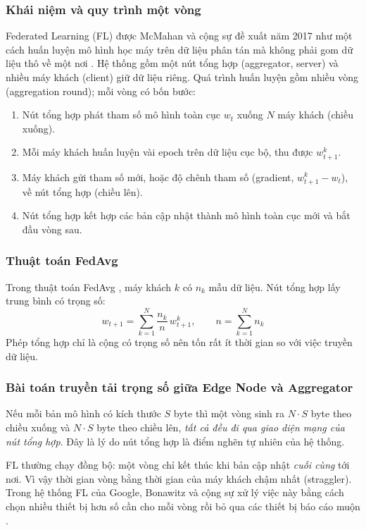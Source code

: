 \subsubsection{Khái niệm và quy trình một vòng}
Federated Learning (FL) được McMahan và cộng sự đề xuất năm 2017 như một cách huấn luyện mô hình học máy trên dữ liệu phân tán mà không phải gom dữ liệu thô về một nơi \cite{mcmahan2017fedavg}. Hệ thống gồm một nút tổng hợp (aggregator, server) và nhiều máy khách (client) giữ dữ liệu riêng. Quá trình huấn luyện gồm nhiều vòng (aggregation round); mỗi vòng có bốn bước:
\begin{enumerate}
    \item Nút tổng hợp phát tham số mô hình toàn cục $w_t$ xuống $N$ máy khách (chiều xuống).
    \item Mỗi máy khách huấn luyện vài epoch trên dữ liệu cục bộ, thu được $w_{t+1}^{k}$.
    \item Máy khách gửi tham số mới, hoặc độ chênh tham số (gradient, $w_{t+1}^{k} - w_t$), về nút tổng hợp (chiều lên).
    \item Nút tổng hợp kết hợp các bản cập nhật thành mô hình toàn cục mới và bắt đầu vòng sau.
\end{enumerate}

\subsubsection{Thuật toán FedAvg}
Trong thuật toán FedAvg \cite{mcmahan2017fedavg}, máy khách $k$ có $n_k$ mẫu dữ liệu. Nút tổng hợp lấy trung bình có trọng số:
\begin{equation}
    w_{t+1} = \sum_{k=1}^{N} \frac{n_k}{n}\, w_{t+1}^{k}, \qquad n = \sum_{k=1}^{N} n_k
    \label{eq:fedavg}
\end{equation}
Phép tổng hợp chỉ là cộng có trọng số nên tốn rất ít thời gian so với việc truyền dữ liệu.

\subsubsection{Bài toán truyền tải trọng số giữa Edge Node và Aggregator}
Nếu mỗi bản mô hình có kích thước $S$ byte thì một vòng sinh ra $N \cdot S$ byte theo chiều xuống và $N \cdot S$ byte theo chiều lên, \emph{tất cả đều đi qua giao diện mạng của nút tổng hợp}. Đây là lý do nút tổng hợp là điểm nghẽn tự nhiên của hệ thống.

FL thường chạy đồng bộ: một vòng chỉ kết thúc khi bản cập nhật \emph{cuối cùng} tới nơi. Vì vậy thời gian vòng bằng thời gian của máy khách chậm nhất (straggler). Trong hệ thống FL của Google, Bonawitz và cộng sự xử lý việc này bằng cách chọn nhiều thiết bị hơn số cần cho mỗi vòng rồi bỏ qua các thiết bị báo cáo muộn \cite{bonawitz2019towards}.

